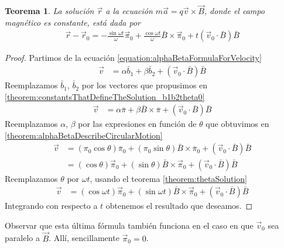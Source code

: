 \documentclass{article}
\newtheorem{theorem}{Teorema}
\begin{document}
  \begin{theorem}
    La solución \(\vec{r}\) a la ecuación \(m \vec{a} = q \vec{v} \times \vec{B}\), donde el campo magnético es constante, está dada por
    \begin{align}
      \vec{r} - \vec{r}_0
      =
      - \frac{\sin \omega t}{\omega}
      \vec{\pi}_0
      + \frac{\cos \omega t}{\omega}
      \bar{B}
      \times
      \vec{\pi}_0
      + t (\vec{v}_0 \cdot \bar{B}) \bar{B}
    \end{align}
  \end{theorem}
  \begin{proof}
    Partimos de la ecuación \eqref{equation:alphaBetaFormulaForVelocity}
    \begin{align}
      \vec{v}
      &=
      \alpha \bar{b}_1 + \beta \bar{b}_2 + (\vec{v}_0 \cdot \bar{B}) \bar{B}
    \end{align}
    Reemplazamos \(\bar{b}_1\), \(\bar{b}_2\) por los vectores que propusimos en \ref{theorem:constantsThatDefineTheSolution_b1b2theta0}
    \begin{align}
      \vec{v}
      &=
      \alpha \bar{\pi} + \beta \bar{B} \times \bar{\pi} + (\vec{v}_0 \cdot \bar{B}) \bar{B}
    \end{align}
    Reemplazamos \(\alpha\), \(\beta\) por las expresiones en función de \(\theta\) que obtuvimos en \ref{theorem:alphaBetaDescribeCircularMotion}
    \begin{align}
      \vec{v}
      &=
      (\pi_0 \cos \theta) \bar{\pi}_0 + (\pi_0 \sin \theta) \bar{B} \times \bar{\pi}_0 + (\vec{v}_0 \cdot \bar{B}) \bar{B}
      \\
      &=
      (\cos \theta) \vec{\pi}_0 + (\sin \theta) \bar{B} \times \vec{\pi}_0 + (\vec{v}_0 \cdot \bar{B}) \bar{B}
    \end{align}
    Reemplazamos \(\theta\) por \(\omega t\), usando el teorema \ref{theorem:thetaSolution}
    \begin{align}
      \vec{v}
      &=
      (\cos \omega t) \vec{\pi}_0
      + (\sin \omega t) \bar{B} \times \vec{\pi}_0
      + (\vec{v}_0 \cdot \bar{B}) \bar{B}
    \end{align}
    Integrando con respecto a \(t\) obtenemos el resultado que deseamos. 
  \end{proof}

  Observar que esta última fórmula también funciona en el caso en que \(\vec{v}_0\) sea paralelo a \(\vec{B}\).
  Allí, sencillamente \(\vec{\pi}_0 = 0\).
\end{document}
